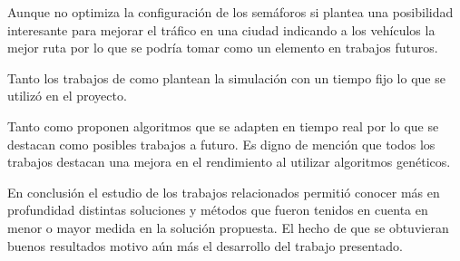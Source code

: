 Aunque \citep{Stolfi2012} no optimiza la configuración de los semáforos si plantea una posibilidad interesante para mejorar el tráfico en una ciudad indicando a los vehículos la mejor ruta por lo que se podría tomar como un elemento en trabajos futuros.

Tanto los trabajos de \citep{Teo2010} como \citep{Stolfi2012} plantean la simulación con un tiempo fijo lo que se utilizó en el proyecto.

Tanto \citep{Montana1996} como \citep{Vogel2000}  proponen algoritmos que se adapten en tiempo real por lo que se destacan como posibles trabajos a futuro.
Es digno de mención que todos los trabajos destacan una mejora en el rendimiento al utilizar algoritmos genéticos. 

En conclusión el estudio de los trabajos relacionados permitió conocer más en profundidad distintas soluciones y métodos que fueron tenidos en cuenta en menor o mayor medida en la solución propuesta. El hecho de que se obtuvieran buenos resultados motivo aún más el desarrollo del trabajo presentado.

